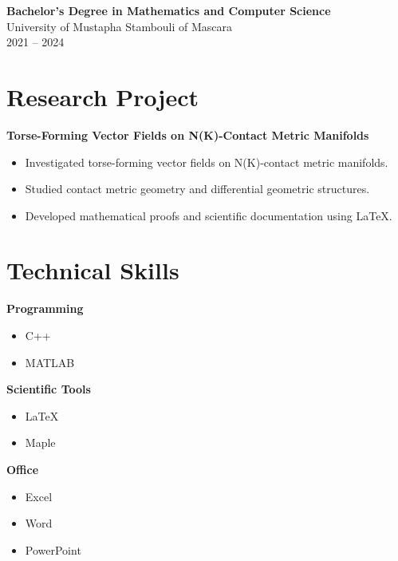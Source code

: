 \documentclass[11pt,a4paper]{article}
\begin{document}
\vspace{0.15cm}

\textbf{Bachelor's Degree in Mathematics and Computer Science}\\
University of Mustapha Stambouli of Mascara\\
2021 -- 2024
\section*{Research Project}
\fontsize{9}{10}\selectfont
\textbf{Torse-Forming Vector Fields on N(K)-Contact Metric Manifolds}

\begin{itemize}[leftmargin=*,itemsep=2pt]
	\item Investigated torse-forming vector fields on N(K)-contact metric manifolds.
	\item Studied contact metric geometry and differential geometric structures.
	\item Developed mathematical proofs and scientific documentation using \LaTeX.
\end{itemize}
\section*{Technical Skills}
\fontsize{9}{10}\selectfont
\noindent
\begin{minipage}[t]{0.32\textwidth}
	\textbf{Programming}
	\begin{itemize}[leftmargin=*,nosep]
		\item C++
		\item MATLAB
	\end{itemize}
\end{minipage}
\hfill
\begin{minipage}[t]{0.32\textwidth}
	\textbf{Scientific Tools}
	\begin{itemize}[leftmargin=*,nosep]
		\item LaTeX
		\item Maple
	\end{itemize}
\end{minipage}
\hfill
\begin{minipage}[t]{0.32\textwidth}
	\textbf{Office}
	\begin{itemize}[leftmargin=*,nosep]
		\item Excel
		\item Word
		\item PowerPoint
	\end{itemize}
\end{minipage}
\end{document}
